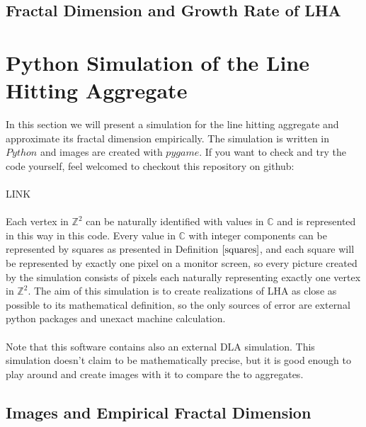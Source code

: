\documentclass[12pt,a4paper]{scrartcl}
\numberwithin{equation}{subsection}
\newcommand{\C}{\mathbb{C}} %
\newcommand{\Z}{\mathbb{Z}} %
\newcommand{\1}{\mathbbm{1}}
\numberwithin{equation}{section}
\theoremstyle{definition}
\begin{document}
\subsection{Fractal Dimension and Growth Rate of LHA}



\newpage
\section{Python Simulation of the Line Hitting Aggregate}
In this section we will present a simulation for the line hitting aggregate and approximate its fractal dimension empirically. The simulation is written in $\mathit{Python}$ and images are created with $\mathit{pygame}$. If you want to check and try the code yourself, feel welcomed to checkout this repository on github:\\
\\LINK \\
\\Each vertex in $\Z^2$ can be naturally identified with values in $\C$ and is represented in this way in this code. Every value in $\C$ with integer components can be represented by squares as presented in Definition $\ref{squares}$, and each square will be represented by exactly one pixel on a monitor screen, so every picture created by the simulation consists of pixels each naturally representing exactly one vertex in $\Z^2$. The aim of this simulation is to create realizations of LHA as close as possible to its mathematical definition, so the only sources of error are external python packages and unexact machine calculation. \\
\\Note that this software contains also an external DLA simulation. This simulation doesn't claim to be mathematically precise, but it is good enough to play around and create images with it to compare the to aggregates. 

\subsection{Images and Empirical Fractal Dimension}
\end{document}
